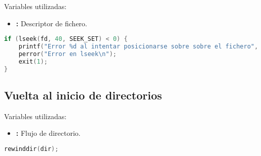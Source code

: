 Variables utilizadas:

\begin{itemize}
	\item{}\textbf{:} Descriptor de fichero.
\end{itemize}

\begin{lstlisting}[language=C]
if (lseek(fd, 40, SEEK_SET) < 0) {
	printf("Error %d al intentar posicionarse sobre sobre el fichero", errno);
	perror("Error en lseek\n");
	exit(1);
}
\end{lstlisting}

\subsection{Vuelta al inicio de directorios}

Variables utilizadas:

\begin{itemize}
	\item{}\textbf{:} Flujo de directorio.
\end{itemize}

\begin{lstlisting}[language=C]
rewinddir(dir);
\end{lstlisting}

